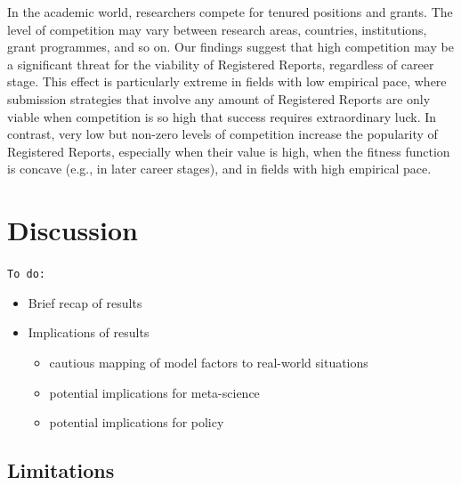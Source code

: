 \documentclass[
  ,man,mask,floatsintext]{apa6}
\providecommand{\tightlist}{%
  \setlength{\itemsep}{0pt}\setlength{\parskip}{0pt}}
\begin{document}
In the academic world, researchers compete for tenured positions and grants.
The level of competition may vary between research areas, countries, institutions, grant programmes, and so on.
Our findings suggest that high competition may be a significant threat for the viability of Registered Reports, regardless of career stage.
This effect is particularly extreme in fields with low empirical pace, where submission strategies that involve any amount of Registered Reports are only viable when competition is so high that success requires extraordinary luck.
In contrast, very low but non-zero levels of competition increase the popularity of Registered Reports, especially when their value is high, when the fitness function is concave (e.g., in later career stages), and in fields with high empirical pace.

\hypertarget{discussion}{%
\section{Discussion}\label{discussion}}

\texttt{To\ do:}

\begin{itemize}
\tightlist
\item
  Brief recap of results
\item
  Implications of results

  \begin{itemize}
  \tightlist
  \item
    cautious mapping of model factors to real-world situations
  \item
    potential implications for meta-science
  \item
    potential implications for policy
  \end{itemize}
\end{itemize}

\hypertarget{limitations}{%
\subsection{Limitations}\label{limitations}}
\end{document}
